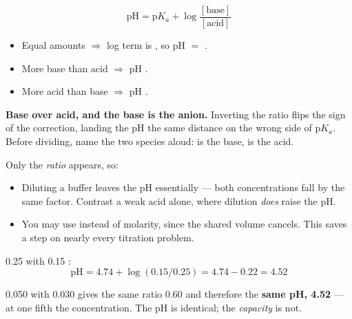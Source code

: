 \documentclass{apchem-notes}
\begin{document}


\[ \boxed{\;\mathrm{pH} = \mathrm{p}K_a
   + \log\frac{[\text{base}]}{[\text{acid}]}\;} \]

\begin{itemize}[leftmargin=*,itemsep=0.3em]
  \item Equal amounts $\Rightarrow$ log term is
        , so pH $=$
        .
  \item More base than acid $\Rightarrow$ pH
        .
  \item More acid than base $\Rightarrow$ pH
        .
\end{itemize}

\begin{apctrap}
\textbf{Base over acid, and the base is the anion.} Inverting the ratio
flips the sign of the correction, landing the pH the same distance on the
wrong side of p$K_a$. Before dividing, name the two species aloud:
 is the base,  is the acid.
\end{apctrap}



Only the \emph{ratio} appears, so:

\begin{itemize}[leftmargin=*,itemsep=0.3em]
  \item Diluting a buffer leaves the pH essentially
         --- both concentrations fall by the
        same factor. Contrast a weak acid alone, where dilution
        \emph{does} raise the pH.
  \item You may use  instead of molarity, since
        the shared volume cancels. This saves a step on nearly every
        titration problem.
\end{itemize}

\begin{workedexample}
\SI{0.25}{\Molar}  with \SI{0.15}{\Molar} :
\[ \mathrm{pH} = 4.74 + \log(0.15/0.25) = 4.74 - 0.22 = \mathbf{4.52} \]

\SI{0.050}{\Molar} with \SI{0.030}{\Molar} gives the same ratio $0.60$ and
therefore the \textbf{same pH, 4.52} --- at one fifth the concentration. The
pH is identical; the \emph{capacity} is not.
\end{workedexample}
\end{document}
